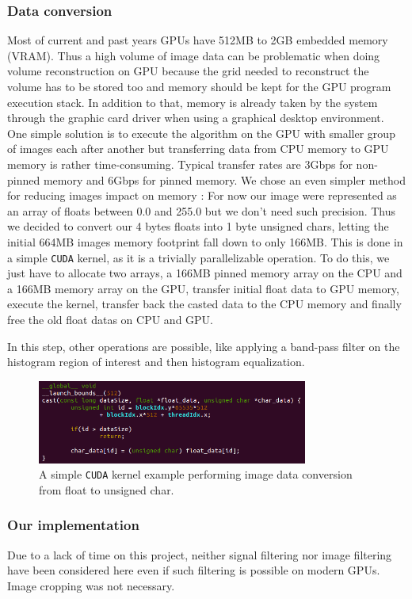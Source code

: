 \documentclass[12pt,journal,compsoc]{IEEEtran}
\begin{document}
\subsubsection{Data conversion}

Most of current and past years GPUs have 512MB to 2GB embedded memory (VRAM). Thus a high volume of image data can be problematic when doing volume reconstruction on GPU because the grid needed to reconstruct the volume has to be stored too and memory should be kept for the GPU program execution stack. In addition to that, memory is already taken by the system through the graphic card driver when using a graphical desktop environment. 
One simple solution is to execute the algorithm on the GPU with smaller group of images each after another but transferring data from CPU memory to GPU memory is rather time-consuming. 
Typical transfer rates are 3Gbps for non-pinned memory and 6Gbps for pinned memory.
We chose an even simpler method for reducing images impact on memory : For now our image were represented as an array of floats between 0.0 and 255.0 but we don't need such precision. Thus we decided to convert our 4 bytes floats into 1 byte unsigned chars, letting the initial 664MB images memory footprint fall down to only 166MB. This is done in a simple \texttt{CUDA} kernel, as it is a trivially parallelizable operation. To do this, we just have to allocate two arrays, a 166MB pinned memory array on the CPU and a 166MB memory array on the GPU, transfer initial float data to GPU memory, execute the kernel, transfer back the casted data to the CPU memory and finally free the old float datas on CPU and GPU.\par
In this step, other operations are possible, like applying a band-pass filter on the histogram region of interest and then histogram equalization.

\begin{figure}[!ht]
\centering
\includegraphics[width=3.5in]{simple_kernel}
\caption{A simple \texttt{CUDA} kernel example performing image data conversion from float to unsigned char.}
\label{kernel}
\end{figure}
	
\subsubsection{Our implementation}
Due to a lack of time on this project, neither signal filtering nor image filtering have been considered here even if such filtering is possible on modern GPUs. Image cropping was not necessary.
\end{document}
